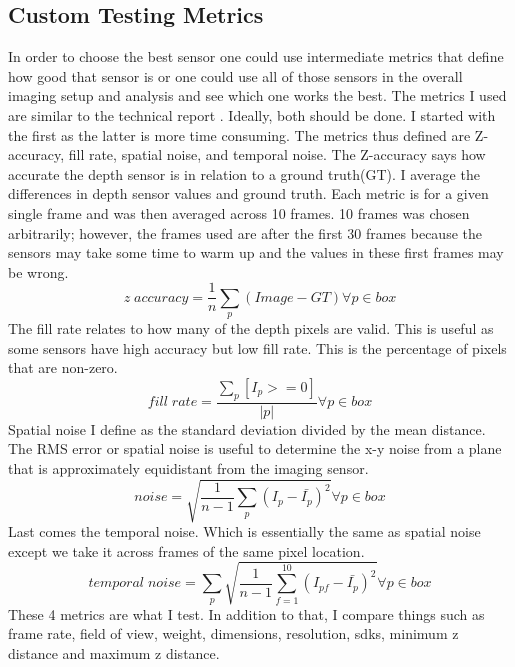 \subsection{Custom Testing Metrics}

In order to choose the best sensor one could use intermediate metrics that define how good that sensor is or one could use all of those sensors in the overall imaging setup and analysis and see which one works the best. The metrics I used are similar to the technical report \cite{depthtesting}. Ideally, both should be done. I started with the first as the latter is more time consuming. The metrics thus defined are Z-accuracy, fill rate, spatial noise, and temporal noise. The Z-accuracy says how accurate the depth sensor is in relation to a ground truth(GT). I average the differences in depth sensor values and ground truth. Each metric is for a given single frame and was then averaged across 10 frames. 10 frames was chosen arbitrarily; however, the frames used are after the first 30 frames because the sensors may take some time to warm up and the values in these first frames may be wrong.
\begin{equation}
	z \; accuracy = \frac{1}{n}\sum_p(Image - GT) \forall p \in box
\end{equation}
The fill rate relates to how many of the depth pixels are valid. This is useful as some sensors have high accuracy but low fill rate. This is the percentage of pixels that are non-zero.
\begin{equation}
	fill \; rate = \frac{\sum_p[I_p >= 0]}{\vert p \vert} \forall p \in box
\end{equation}
Spatial noise I define as the standard deviation divided by the mean distance.
The RMS error or spatial noise is useful to determine the x-y noise from a plane that is approximately equidistant from the imaging sensor.
\begin{equation}
	noise = \sqrt{\frac{1}{n-1}\sum_p(I_p-{\bar{I_p}})^2} \forall p \in box
\end{equation}
Last comes the temporal noise. Which is essentially the same as spatial noise except we take it across frames of the same pixel location.
\begin{equation}
	temporal \; noise = \sum_p\sqrt{\frac{1}{n-1}\sum_{f=1}^{10}(I_{pf}-\bar{I_p})^2} \forall p \in box
\end{equation}
These 4 metrics are what I test. In addition to that, I compare things such as frame rate, field of view, weight, dimensions, resolution, sdks, minimum z distance and maximum z distance.

